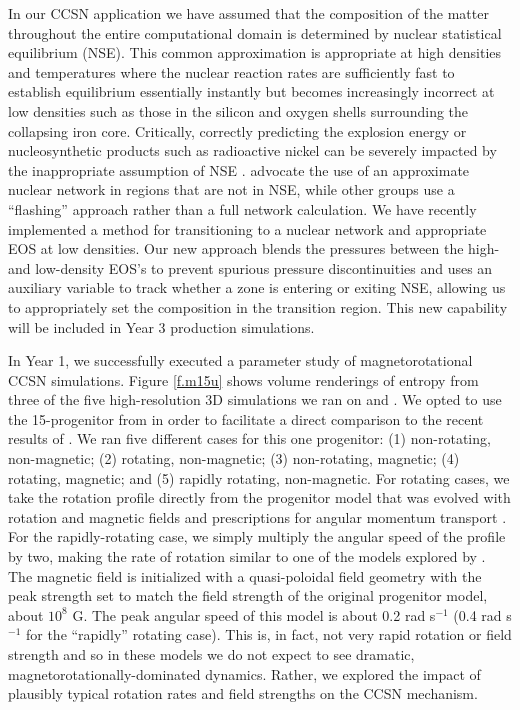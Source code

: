 \documentclass[12pt]{article}
\begin{document}
In our \flash CCSN application we have assumed that the composition of the matter throughout the entire computational domain is determined by nuclear statistical equilibrium (NSE).
This common approximation \citep[e.g.,][]{burrows:2007, Ott:2008, Dolence:2015, Skinner:2016, Roberts:2016, Kuroda:2016} is appropriate at high densities and temperatures where the nuclear reaction rates are sufficiently fast to establish equilibrium essentially instantly but becomes increasingly incorrect at low densities such as those in the silicon and oxygen shells surrounding the collapsing iron core.
Critically, correctly predicting the explosion energy or nucleosynthetic products such as radioactive nickel can be severely impacted by the inappropriate assumption of NSE \citep{bruenn:2016}.
\citet{bruenn:2016} advocate the use of an approximate nuclear network in regions that are not in NSE, while other groups \citep[e.g.,][]{muller:2012a, Melson:2015} use a ``flashing'' approach rather than a full network calculation.
We have recently implemented a method for transitioning to a nuclear network and appropriate EOS at low densities.
Our new approach blends the pressures between the high- and low-density EOS's to prevent spurious pressure discontinuities and uses an auxiliary variable to track whether a zone is entering or exiting NSE, allowing us to appropriately set the composition in the transition region.
This new capability will be included in Year 3 production simulations.

In Year 1, we successfully executed a parameter study of magnetorotational CCSN simulations. 
Figure \ref{f.m15u} shows volume renderings of entropy from three of the five high-resolution 3D simulations we ran on \mira and \thet. 
We opted to use the 15-\msun progenitor from \citet{heger:2005} in order to facilitate a direct comparison to the recent results of \citet{summa:2018}.
We ran five different cases for this one progenitor: (1) non-rotating, non-magnetic; (2) rotating, non-magnetic; (3) non-rotating, magnetic; (4) rotating, magnetic; and (5) rapidly rotating, non-magnetic. 
For rotating cases, we take the rotation profile directly from the progenitor model that was evolved with rotation and magnetic fields and prescriptions for angular momentum transport \citep{heger:2005}. 
For the rapidly-rotating case, we simply multiply the angular speed of the profile by two, making the rate of rotation similar to one of the models explored by \citet{summa:2018}.
The magnetic field is initialized with a quasi-poloidal field geometry with the peak strength set to match the field strength of the original progenitor model, about $10^8$ G. 
The peak angular speed of this model is about 0.2 rad s$^{-1}$ (0.4 rad s$^{-1}$ for the ``rapidly'' rotating case). 
This is, in fact, not very rapid rotation or field strength and so in these models we do not expect to see dramatic, magnetorotationally-dominated dynamics. 
Rather, we explored the impact of plausibly typical rotation rates and field strengths on the CCSN mechanism. 
\end{document}
